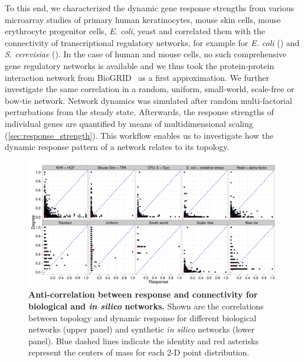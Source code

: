 To this end, we characterized the dynamic gene response strengths from 
various microarray studies of primary human keratinocytes, mouse skin
cells, mouse erythrocyte progenitor cells, \emph{E. coli}, yeast and
correlated them with the connectivity of
transcriptional regulatory networks, for example for \emph{E. coli} 
(\citealp{Gama-Castro2008}) 
and \emph{S. cerevisiae} (\citealp{Balaji2006}). In the case of human and
mouse cells, no such comprehensive gene regulatory networks is available
and we thus took the protein-protein interaction network from BioGRID~%
\citep{Stark2006} as a first approximation. 
We further investigate the same correlation in a random,
uniform, small-world, scale-free or bow-tie network. Network dynamics was simulated after 
random 
multi-factorial perturbations from the steady state. Afterwards, the response 
strengths of individual genes are quantified by means of multidimensional 
scaling (\ref{sec:response_strength}). 
This workflow enables us to investigate how the dynamic
response pattern of a network relates to its topology. 

\begin{figure}[!ht]
\begin{center}
\includegraphics[width=\textwidth]{degree_response-example.pdf}
\end{center}
\caption[Anti-correlation between response and connectivity]{
{\bf Anti-correlation between response and connectivity for biological and 
\emph{in silico} networks.} 
Shown are the correlations between topology and dynamic response for different
biological networks (upper panel) and synthetic \emph{in silico} networks
(lower panel). Blue dashed lines indicate the identity and red asterisks 
represent the centers of mass for each 2-D point distribution.
}
\label{fig:degree_response_example}
\end{figure}

